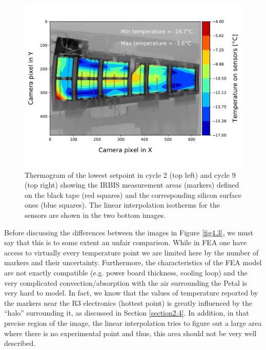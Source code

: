 \begin{figure}[ht!]
			\includegraphics[scale=0.39]{Figures/Chapter04/thermogram_markers_9_201711271006.pdf}
			\caption{Thermogram of the lowest setpoint in cycle 2 (top left) and cycle 9 (top right) showing the IRBIS measurement areas (markers) defined on the black tape (red squares) and the corresponding silicon surface ones (blue squares). The linear interpolation isotherms for the sensors are shown in the two bottom images.}\label{fig4.2}
		\end{figure}
		
		Before discussing the differences between the images in Figure \ref{fig4.3}, we must say that this is to some extent an unfair comparison. While in FEA one have access to virtually every temperature point we are limited here by the number of markers and their uncertainty. Furthermore, the characteristics of the FEA model are not exactly compatible (e.g. power board thickness, cooling loop) and the very complicated convection/absorption with the air surrounding the Petal is very hard to model. In fact, we know that the values of temperature reported by the markers near the R3 electronics (hottest point) is greatly influenced by the “halo” surrounding it, as discussed in Section \ref{section2.4}. In addition, in that precise region of the image, the linear interpolation tries to figure out a large area where there is no experimental point and thus, this area should not be very well described.
		
